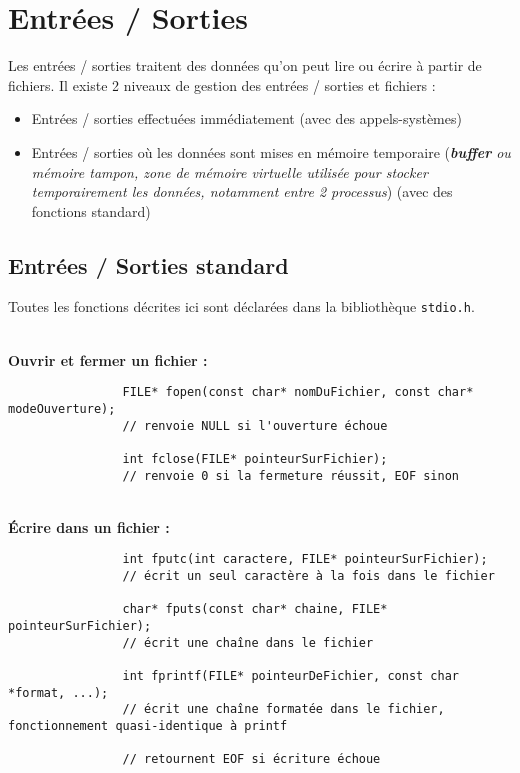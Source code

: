 \section{Entrées / Sorties}
	Les entrées / sorties traitent des données qu'on peut lire ou écrire à partir de fichiers. Il existe 2 niveaux de gestion des entrées / sorties et fichiers :
	\begin{itemize}
		\item Entrées / sorties effectuées immédiatement (avec des appels-systèmes)
		\item Entrées / sorties où les données sont mises en mémoire temporaire (\textit{\textbf{buffer} ou mémoire tampon, zone de mémoire virtuelle utilisée pour stocker temporairement les données, notamment entre 2 processus}) (avec des fonctions standard)
	\end{itemize}
	
	\subsection{Entrées / Sorties standard}
		Toutes les fonctions décrites ici sont déclarées dans la bibliothèque \lstinline!stdio.h!.
		
		~\\\textbf{Ouvrir et fermer un fichier :}
			
			\begin{lstlisting}
				FILE* fopen(const char* nomDuFichier, const char* modeOuverture);
				// renvoie NULL si l'ouverture échoue
				
				int fclose(FILE* pointeurSurFichier);
				// renvoie 0 si la fermeture réussit, EOF sinon
			\end{lstlisting}
		
		~\\\textbf{Écrire dans un fichier :}
		
			\begin{lstlisting}
				int fputc(int caractere, FILE* pointeurSurFichier);
				// écrit un seul caractère à la fois dans le fichier
				
				char* fputs(const char* chaine, FILE* pointeurSurFichier);
				// écrit une chaîne dans le fichier
				
				int fprintf(FILE* pointeurDeFichier, const char *format, ...); 
				// écrit une chaîne formatée dans le fichier, fonctionnement quasi-identique à printf
				
				// retournent EOF si écriture échoue
			\end{lstlisting}
			
